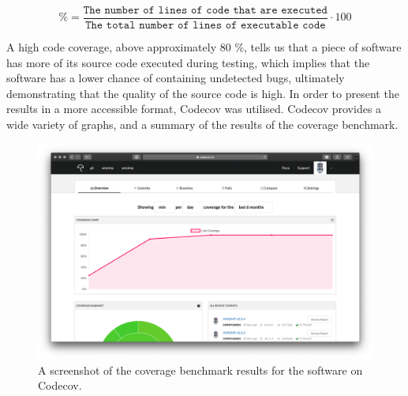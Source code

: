 \begin{equation}
    \label{coverage_py}
    \% = \frac{\texttt{The number of lines of code that are executed}}{\texttt{The total number of lines of executable code}} \cdot 100
\end{equation}

A high code coverage, above approximately 80 \%, tells us that a piece of software has more of its source code executed during testing, which implies that the software has a lower chance of containing undetected bugs, ultimately demonstrating that the quality of the source code is high. In order to present the results in a more accessible format, Codecov was utilised\cite{codecov}. Codecov provides a wide variety of graphs, and a summary of the results of the coverage benchmark.

\begin{figure}[H]
    \centering
    \includegraphics[width=.8\linewidth]{Images/codecov.png}
    \caption{A screenshot of the coverage benchmark results for the software on Codecov.}
    \label{codecov_image}
\end{figure}